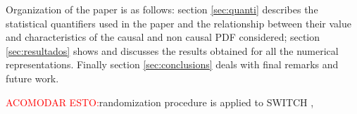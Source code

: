 Organization of the paper is as follows:
section \ref{sec:quanti} describes the statistical quantifiers used in the paper and the relationship between their value and characteristics of the causal and non causal PDF considered;
section \ref{sec:resultados} shows and discusses the results obtained for all the numerical representations.
Finally section \ref{sec:conclusions} deals with final remarks and future work.


\textcolor{red}{ACOMODAR ESTO:}randomization procedure is applied to SWITCH \cite{DeMicco2008}, 